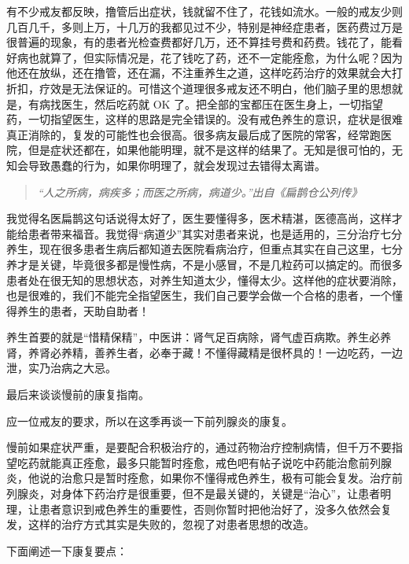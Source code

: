 \documentclass{ctexart}
\begin{document}
有不少戒友都反映，撸管后出症状，钱就留不住了，花钱如流水。一般的戒友少则几百几千，多则上万，十几万的我都见过不少，特别是神经症患者，医药费过万是很普遍的现象，有的患者光检查费都好几万，还不算挂号费和药费。钱花了，能看好病也就算了，但实际情况是，花了钱吃了药，还不一定能痊愈，为什么呢？因为他还在放纵，还在撸管，还在漏，不注重养生之道，这样吃药治疗的效果就会大打折扣，疗效是无法保证的。可惜这个道理很多戒友还不明白，他们脑子里的思想就是，有病找医生，然后吃药就 OK 了。把全部的宝都压在医生身上，一切指望药，一切指望医生，这样的思路是完全错误的。没有戒色养生的意识，症状是很难真正消除的，复发的可能性也会很高。很多病友最后成了医院的常客，经常跑医院，但是症状还都在，如果他能明理，就不是这样的结果了。无知是很可怕的，无知会导致愚蠢的行为，如果你明理了，就会发现过去错得太离谱。

\begin{quote}\it
    “人之所病，病疾多；而医之所病，病道少。”出自《扁鹊仓公列传》
\end{quote}

我觉得名医扁鹊这句话说得太好了，医生要懂得多，医术精湛，医德高尚，这样才能给患者带来福音。我觉得“病道少”其实对患者来说，也是适用的，三分治疗七分养生，现在很多患者生病后都知道去医院看病治疗，但重点其实在自己这里，七分养才是关键，毕竟很多都是慢性病，不是小感冒，不是几粒药可以搞定的。而很多患者处在很无知的思想状态，对养生知道太少，懂得太少。这样他的症状要消除，也是很难的，我们不能完全指望医生，我们自己要学会做一个合格的患者，一个懂得养生的患者，天助自助者！

养生首要的就是“惜精保精”，中医讲：肾气足百病除，肾气虚百病欺。养生必养肾，养肾必养精，善养生者，必奉于藏！不懂得藏精是很杯具的！一边吃药，一边泄，实乃治病之大忌。

最后来谈谈慢前的康复指南。

应一位戒友的要求，所以在这季再谈一下前列腺炎的康复。

慢前如果症状严重，是要配合积极治疗的，通过药物治疗控制病情，但千万不要指望吃药就能真正痊愈，最多只能暂时痊愈，戒色吧有帖子说吃中药能治愈前列腺炎，他说的治愈只是暂时痊愈，如果你不懂得戒色养生，极有可能会复发。治疗前列腺炎，对身体下药治疗是很重要，但不是最关键的，关键是“治心”，让患者明理，让患者意识到戒色养生的重要性，否则你暂时把他治好了，没多久依然会复发，这样的治疗方式其实是失败的，忽视了对患者思想的改造。

下面阐述一下康复要点：
\end{document}
